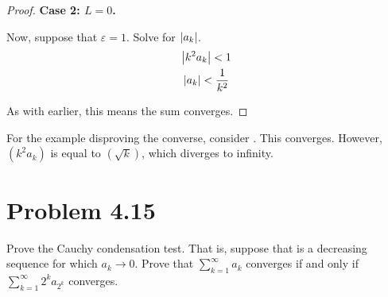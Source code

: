 \documentclass[12pt]{report}
\newenvironment{case}[2]{\par\textbf{Case #1: #2.}}{}
\begin{document}
\begin{proof}
\begin{case}{2}{$L = 0$}

                Now, suppose that $\varepsilon = 1$.
                Solve for $\left| a_k \right|$.
                \begin{gather}
                    \left| k^2 a_k \right| < 1\\
                    \left| a_k \right| < \frac{1}{k^2}
                \end{gather}

                As with earlier, this means the sum converges.
            \end{case}
        \end{proof}

        For the example disproving the converse, consider .
        This converges.
        However, $(k^2 a_k)$ is equal to $(\sqrt{k})$, which diverges to infinity.
    \pagebreak

\section{Problem 4.15}
    Prove the Cauchy condensation test. 
    That is, suppose that  is a decreasing sequence for which $a_k \to 0$. 
    Prove that $\sum_{k=1}^{\infty} a_k$ converges if and only if $\sum_{k=1}^{\infty} 2^k a_{2^k}$ converges. 
\end{document}
